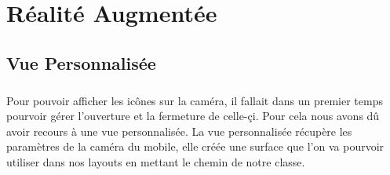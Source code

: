 \chapter{Réalité Augmentée}

  \section*{Vue Personnalisée}
  
    \paragraph{}
    Pour pouvoir afficher les icônes sur la caméra, il fallait dans un premier temps pourvoir gérer l'ouverture et la fermeture de celle-çi. Pour cela 
    nous avons dû avoir recours à une vue personnalisée. La vue personnalisée récupère les paramètres de la caméra du mobile, elle créée une surface que
    l'on va pourvoir utiliser dans nos layouts en mettant le chemin de notre classe.
    

